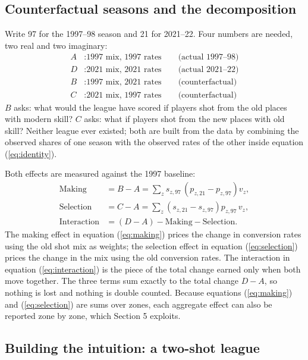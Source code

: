 \documentclass[12pt]{article}
\begin{document}
\subsection{Counterfactual seasons and the decomposition}

Write 97 for the 1997--98 season and 21 for 2021--22. Four numbers are
needed, two real and two imaginary:
\begin{align*}
A &: \text{1997 mix, 1997 rates} \qquad \text{(actual 1997--98)}\\
D &: \text{2021 mix, 2021 rates} \qquad \text{(actual 2021--22)}\\
B &: \text{1997 mix, 2021 rates} \qquad \text{(counterfactual)}\\
C &: \text{2021 mix, 1997 rates} \qquad \text{(counterfactual)}
\end{align*}
$B$ asks: what would the league have scored if players shot from the old
places with modern skill? $C$ asks: what if players shot from the new places
with old skill? Neither league ever existed; both are built from the data by
combining the observed shares of one season with the observed rates of the
other inside equation (\ref{eq:identity}).

Both effects are measured against the 1997 baseline:
\begin{align}
\text{Making}    &= B - A = \sum_z s_{z,97}\,\left(p_{z,21}-p_{z,97}\right) v_z,
\label{eq:making}\\
\text{Selection} &= C - A = \sum_z \left(s_{z,21}-s_{z,97}\right) p_{z,97}\, v_z,
\label{eq:selection}\\
\text{Interaction} &= (D-A) - \text{Making} - \text{Selection}.
\label{eq:interaction}
\end{align}
The making effect in equation (\ref{eq:making}) prices the change in
conversion rates using the old shot mix as weights; the selection effect in
equation (\ref{eq:selection}) prices the change in the mix using the old
conversion rates. The interaction in equation (\ref{eq:interaction}) is the
piece of the total change earned only when both move together. The three
terms sum exactly to the total change $D-A$, so nothing is lost and nothing
is double counted. Because equations (\ref{eq:making}) and
(\ref{eq:selection}) are sums over zones, each aggregate effect can also be
reported zone by zone, which Section 5 exploits.

\subsection{Building the intuition: a two-shot league}
\end{document}

